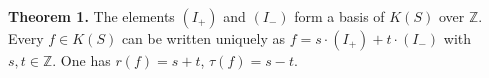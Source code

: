 \textbf{Theorem 1.} The elements $(I_+)$ and $(I_-)$ form a basis of $K(S)$ over $\mathbb{Z}$. Every $f \in K(S)$ can be written uniquely as $f = s \cdot (I_+) + t \cdot (I_-)$ with $s, t \in \mathbb{Z}$. One has $r(f) = s + t$, $\tau(f) = s - t$.

